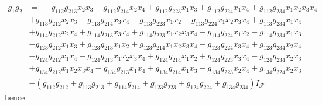 \documentclass[aps,preprint]{revtex4}%
\begin{document}
\begin{align}
g_{1}g_{2}  &  =\,-\mathit{g}_{112}\mathit{g}_{213}x_{2}x_{3}-\mathit{g}%
_{112}\mathit{g}_{214}x_{2}x_{4}+\mathit{g}_{112}\mathit{g}_{223}x_{1}%
x_{3}+\mathit{g}_{112}\mathit{g}_{224}x_{1}x_{4}+\mathit{g}_{112}%
\mathit{g}_{234}x_{1}x_{2}x_{3}x_{4}\\
&  +\mathit{g}_{113}\mathit{g}_{212}x_{2}x_{3}-\mathit{g}_{113}\mathit{g}%
_{214}x_{3}x_{4}-\mathit{g}_{113}\mathit{g}_{223}x_{1}x_{2}-\mathit{g}%
_{113}\mathit{g}_{224}x_{1}x_{2}x_{3}x_{4}+\mathit{g}_{113}\mathit{g}%
_{234}x_{1}x_{4}\\
&  +\mathit{g}_{114}\mathit{g}_{212}x_{2}x_{4}+\mathit{g}_{114}\mathit{g}%
_{213}x_{3}x_{4}+\mathit{g}_{114}\mathit{g}_{223}x_{1}x_{2}x_{3}%
x_{4}-\mathit{g}_{114}\mathit{g}_{224}x_{1}x_{2}-\mathit{g}_{114}%
\mathit{g}_{234}x_{1}x_{3}\\
&  -\mathit{g}_{123}\mathit{g}_{212}x_{1}x_{3}+\mathit{g}_{123}\mathit{g}%
_{213}x_{1}x_{2}+\mathit{g}_{123}\mathit{g}_{214}x_{1}x_{2}x_{3}%
x_{4}-\mathit{g}_{123}\mathit{g}_{224}x_{3}x_{4}+\mathit{g}_{123}%
\mathit{g}_{234}x_{2}x_{4}\\
&  -\mathit{g}_{124}\mathit{g}_{212}x_{1}x_{4}-\mathit{g}_{124}\mathit{g}%
_{213}x_{1}x_{2}x_{3}x_{4}+\mathit{g}_{124}\mathit{g}_{214}x_{1}%
x_{2}+\mathit{g}_{124}\mathit{g}_{223}x_{3}x_{4}-\mathit{g}_{124}%
\mathit{g}_{234}x_{2}x_{3}\\
&  +\mathit{g}_{134}\mathit{g}_{212}x_{1}x_{2}x_{3}x_{4}-\mathit{g}%
_{134}\mathit{g}_{213}x_{1}x_{4}+\mathit{g}_{134}\mathit{g}_{214}x_{1}%
x_{3}-\mathit{g}_{134}\mathit{g}_{223}x_{2}x_{4}+\mathit{g}_{134}%
\mathit{g}_{224}x_{2}x_{3}\\
&  -\left(  \mathit{g}_{112}\mathit{g}_{212}+\mathit{g}_{113}\mathit{g}%
_{213}+\mathit{g}_{114}\mathit{g}_{214}+\mathit{g}_{123}\mathit{g}%
_{223}+\mathit{g}_{124}\mathit{g}_{224}+\mathit{g}_{134}\mathit{g}%
_{234}\right)  I_{\mathcal{F}}%
\end{align}
hence%
\end{document}
